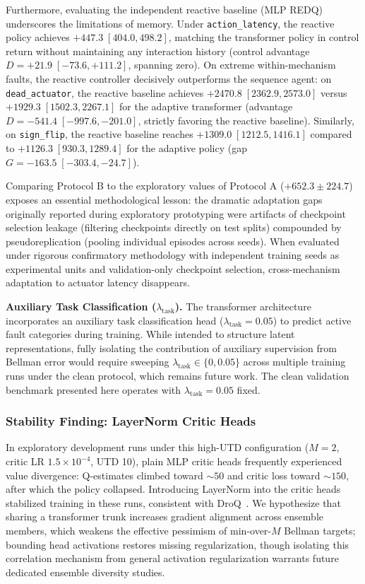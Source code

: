 \documentclass[conference]{IEEEtran}
\begin{document}
Furthermore, evaluating the independent reactive baseline (MLP REDQ) underscores the limitations of memory. Under \texttt{action\_latency}, the reactive policy achieves $+447.3 \; [404.0, 498.2]$, matching the transformer policy in control return without maintaining any interaction history (control advantage $D = +21.9 \; [-73.6, +111.2]$, spanning zero). On extreme within-mechanism faults, the reactive controller decisively outperforms the sequence agent: on \texttt{dead\_actuator}, the reactive baseline achieves $+2470.8 \; [2362.9, 2573.0]$ versus $+1929.3 \; [1502.3, 2267.1]$ for the adaptive transformer (advantage $D = -541.4 \; [-997.6, -201.0]$, strictly favoring the reactive baseline). Similarly, on \texttt{sign\_flip}, the reactive baseline reaches $+1309.0 \; [1212.5, 1416.1]$ compared to $+1126.3 \; [930.3, 1289.4]$ for the adaptive policy (gap $G = -163.5 \; [-303.4, -24.7]$). 

Comparing Protocol B to the exploratory values of Protocol A ($+652.3 \pm 224.7$) exposes an essential methodological lesson: the dramatic adaptation gaps originally reported during exploratory prototyping were artifacts of checkpoint selection leakage (filtering checkpoints directly on test splits) compounded by pseudoreplication (pooling individual episodes across seeds). When evaluated under rigorous confirmatory methodology with independent training seeds as experimental units and validation-only checkpoint selection, cross-mechanism adaptation to actuator latency disappears.

\textbf{Auxiliary Task Classification ($\lambda_{\text{task}}$).}
The transformer architecture incorporates an auxiliary task classification head ($\lambda_{\text{task}} = 0.05$) to predict active fault categories during training. While intended to structure latent representations, fully isolating the contribution of auxiliary supervision from Bellman error would require sweeping $\lambda_{\text{task}} \in \{0, 0.05\}$ across multiple training runs under the clean protocol, which remains future work. The clean validation benchmark presented here operates with $\lambda_{\text{task}} = 0.05$ fixed.

\subsubsection{Stability Finding: LayerNorm Critic Heads}
\label{sec:stability}
In exploratory development runs under this high-UTD configuration ($M{=}2$, critic LR $1.5{\times}10^{-4}$, UTD 10), plain MLP critic heads frequently experienced value divergence: Q-estimates climbed toward ${\sim}50$ and critic loss toward ${\sim}150$, after which the policy collapsed. Introducing LayerNorm into the critic heads stabilized training in these runs, consistent with DroQ~\cite{droq}. We hypothesize that sharing a transformer trunk increases gradient alignment across ensemble members, which weakens the effective pessimism of min-over-$M$ Bellman targets; bounding head activations restores missing regularization, though isolating this correlation mechanism from general activation regularization warrants future dedicated ensemble diversity studies.
\end{document}

